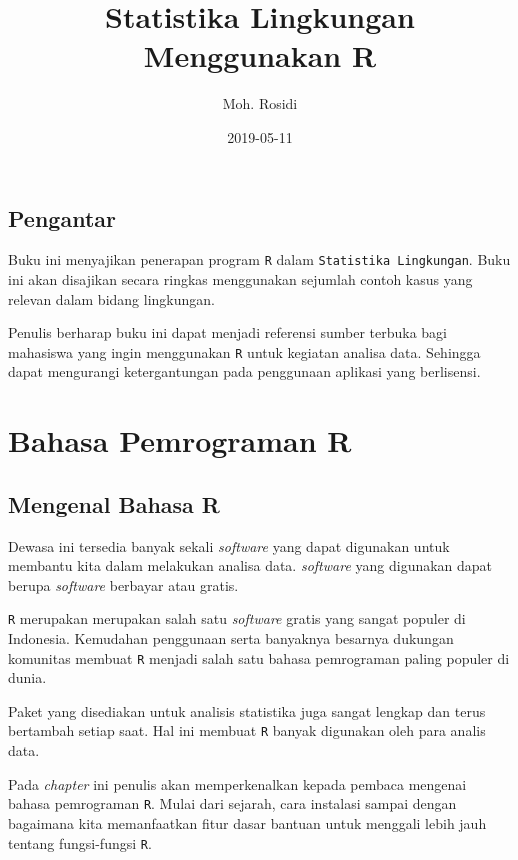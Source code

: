 \documentclass[]{book}
\title{Statistika Lingkungan Menggunakan R}
\author{Moh. Rosidi}
\date{2019-05-11}
\begin{document}
\maketitle

{
\hypersetup{linkcolor=black}
\setcounter{tocdepth}{1}
\tableofcontents
}
\listoftables
\listoffigures
\chapter*{Pengantar}\label{pengantar}

Buku ini menyajikan penerapan program \texttt{R} dalam
\texttt{Statistika\ Lingkungan}. Buku ini akan disajikan secara ringkas
menggunakan sejumlah contoh kasus yang relevan dalam bidang lingkungan.

Penulis berharap buku ini dapat menjadi referensi sumber terbuka bagi
mahasiswa yang ingin menggunakan \texttt{R} untuk kegiatan analisa data.
Sehingga dapat mengurangi ketergantungan pada penggunaan aplikasi yang
berlisensi.

\part*{Bahasa Pemrograman R}\label{part-bahasa-pemrograman-r}

\chapter{Mengenal Bahasa R}\label{mengenal-bahasa-r}

Dewasa ini tersedia banyak sekali \emph{software} yang dapat digunakan
untuk membantu kita dalam melakukan analisa data. \emph{software} yang
digunakan dapat berupa \emph{software} berbayar atau gratis.

\texttt{R} merupakan merupakan salah satu \emph{software} gratis yang
sangat populer di Indonesia. Kemudahan penggunaan serta banyaknya
besarnya dukungan komunitas membuat \texttt{R} menjadi salah satu bahasa
pemrograman paling populer di dunia.

Paket yang disediakan untuk analisis statistika juga sangat lengkap dan
terus bertambah setiap saat. Hal ini membuat \texttt{R} banyak digunakan
oleh para analis data.

Pada \emph{chapter} ini penulis akan memperkenalkan kepada pembaca
mengenai bahasa pemrograman \texttt{R}. Mulai dari sejarah, cara
instalasi sampai dengan bagaimana kita memanfaatkan fitur dasar bantuan
untuk menggali lebih jauh tentang fungsi-fungsi \texttt{R}.
\end{document}
